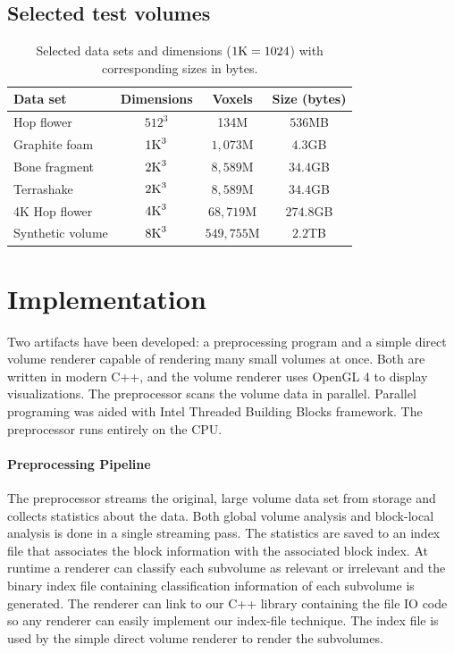 \documentclass[journal]{vgtc}                %
\begin{document}
\subsection{Selected test volumes}\label{ssec:selectedTestVolumes}
\begin{table}[h]
	\caption{Selected data sets and dimensions ($1\textnormal{K}=\nobreak1024$) 
		with corresponding sizes in bytes.}\label{table:selectedTestVolumes}
	\scriptsize
	\begin{center}
		\begin{tabular}{lccc}
			\textbf{Data set} & \textbf{Dimensions} & \textbf{Voxels} & \textbf{Size} (bytes)\\
			\hline
			Hop flower & $512^3$ & 134M & $536$MB \\
			Graphite foam & $1\textnormal{K}^3$ & $1,073$M & $4.3$GB  \\
     		Bone fragment & $2\textnormal{K}^3$ & $8,589$M & $34.4$GB  \\
     		Terrashake & $2\textnormal{K}^3$ & $8,589$M & $34.4$GB  \\
			4K Hop flower & $4\textnormal{K}^3$ & $68,719$M & $274.8$GB \\
			Synthetic volume & $8\textnormal{K}^3$ & $549,755$M & $2.2$TB  \\
		\end{tabular}
	\end{center}
\end{table}


\section{Implementation}
Two artifacts have been developed: a preprocessing program and a simple direct
volume renderer capable of rendering many small volumes at once.  
Both are written in modern C++, and the volume
renderer uses OpenGL 4 to display visualizations. The preprocessor scans the volume
data in parallel. Parallel programing was aided with Intel Threaded Building Blocks
framework. The preprocessor runs entirely on the CPU.


\paragraph{Preprocessing Pipeline} 
The preprocessor streams the original, large volume data set from storage and
collects statistics about the data. Both global volume analysis and block-local analysis
is done in a single streaming pass. The statistics are saved to an index file that associates
the block information with the associated block index. At runtime a renderer can 
classify each subvolume as relevant or irrelevant and the binary index file containing
classification information of each subvolume is generated.  The renderer can link to our C++
library containing the file IO code so any renderer can easily implement our index-file technique. 
The index file is used by the simple direct volume renderer to render the subvolumes.
\end{document}
